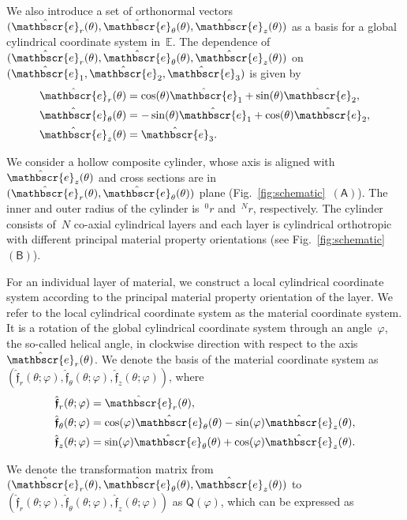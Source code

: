 \documentclass[preprint,10pt,times]{elsarticle}
\numberwithin{equation}{section}
\newcommand{\physe}{\hat{\mathbscr{e}}} %
\newcommand{\physf}{\hat{\boldsymbol{\mathfrak{f}}}}
\renewcommand{\u}[1]{\boldsymbol{#1}}
\newcommand{\usf}[1]{\u{\mathsf #1}}
\newcommand{\pr}[1]{\left( #1 \right)}
\newcommand{\subf}[1]{\pr{\textsf{#1}}}
\renewcommand{\>}{$\Rightarrow$}
\begin{document}
We also introduce a set of orthonormal vectors~$(\physe_{r}(\theta),\physe_{\theta}(\theta),\physe_{z}(\theta))$ as a basis for a global cylindrical coordinate system in~$\mathbb{E}$. The dependence of~$(\physe_{r}(\theta),\physe_{\theta}(\theta),\physe_{z}(\theta))$ on~$(\physe_1,\physe_2,\physe_3)$ is given by
\begin{subequations}
\begin{align}
\physe_{r}(\theta) & = \cos(\theta) \physe_1 + \sin(\theta) \physe_2 , \\
\physe_{\theta}(\theta) & = -\sin(\theta) \physe_1 + \cos(\theta) \physe_2 , \\
\physe_{z} (\theta) & =  \physe_3.
\end{align}
\end{subequations}

We consider a hollow composite cylinder, whose axis is aligned with~$\physe_{z}(\theta)$ and cross sections are in~$(\physe_{r}(\theta),\physe_{\theta}(\theta))$ plane (Fig.~\ref{fig:schematic}~$\subf{A}$).
The inner and outer radius of the cylinder is~${}^{0}\!{r}$ and~${}^{N}\!{r}$, respectively.
The cylinder consists of~$N$ co-axial cylindrical layers and each layer is cylindrical orthotropic with different principal material property orientations (see Fig.~\ref{fig:schematic}~$\subf{B}$).

For an individual layer of material, we construct a local cylindrical coordinate system according to the principal material property orientation of the layer. We refer to the local cylindrical coordinate system as the material coordinate system. It is a rotation of the global cylindrical coordinate system through an angle~$\varphi$, the so-called helical angle, in clockwise direction with respect to the axis~$\physe_{r}(\theta)$.
We denote the basis of the material coordinate system as~$(\physf_{r}(\theta;\varphi),\physf_{\theta}(\theta;\varphi),\physf_{z}(\theta;\varphi))$, where
\begin{subequations}
\begin{align}
\physf_{r} (\theta;\varphi) & =  \physe_r (\theta),\\
\physf_{\theta} (\theta;\varphi)& = \cos(\varphi) \physe_{\theta} (\theta) - \sin(\varphi) \physe_z (\theta), \\
\physf_{z}(\theta;\varphi) & = \sin(\varphi) \physe_{\theta} (\theta) + \cos(\varphi) \physe_z (\theta).
\end{align}
\end{subequations}


We denote the transformation matrix from~$(\physe_{r}(\theta),\physe_{\theta}(\theta),\physe_{z}(\theta))$ to~$(\physf_{r}(\theta;\varphi),\physf_{\theta}(\theta;\varphi),\physf_{z}(\theta;\varphi))$ as $\usf{Q}(\varphi)$, which can be expressed as
\end{document}
